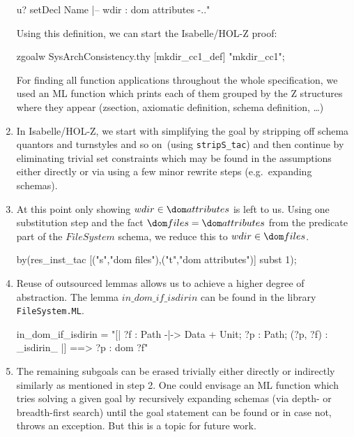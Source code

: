 \begin{enumerate}
\begin{holzverb}
                   u? setDecl Name
                 |--
                   wdir : dom attributes
                 -.." 
\end{holzverb}
%
Using this definition, we can start the Isabelle/HOL-Z proof:
\begin{holzverb}
zgoalw SysArchConsistency.thy [mkdir_cc1_def] "mkdir_cc1";
\end{holzverb}
For finding all function applications throughout the whole specification, we
used an ML function which prints each of them grouped by the Z structures where
they appear (zsection, axiomatic definition, schema definition, \dots)
\item In Isabelle/HOL-Z, we start with simplifying the goal by stripping off
  schema quantors and turnstyles and so on~(using \verb|stripS_tac|) and then
  continue by eliminating trivial set constraints which may be found in the
  assumptions either directly or via using a few minor rewrite steps (e.g.\
  expanding schemas).
\item At this point only showing $wdir \in \dom attributes$ is left to us. Using
  one substitution step and the fact $\dom files = \dom attributes$ from the
  predicate part of the $FileSystem$ schema, we reduce this to $wdir \in \dom
  files$.
\begin{holzverb}
by(res_inst_tac [("s","dom files"),("t","dom attributes")] subst 1);
\end{holzverb}
\item Reuse of outsourced lemmas allows us to achieve a higher degree of
  abstraction. The lemma $in\_dom\_if\_isdirin$ can be found in the library
  \verb|FileSystem.ML|.
%
%
\begin{holzverb}
 in_dom_if_isdirin
 =
   "[| ?f : Path -|-> Data + Unit; ?p : Path; (?p, ?f) : _isdirin_ |]
      ==> ?p : dom ?f"  
\end{holzverb}
%
\item The remaining subgoals can be erased trivially either directly or
  indirectly similarly as mentioned in step 2. One could envisage an ML function
  which tries solving a given goal by recursively expanding schemas (via depth-
  or breadth-first search) until the goal statement can be found or in case not,
  throws an exception. But this is a topic for future work.
\end{enumerate}
%
%
%
%
%
%

